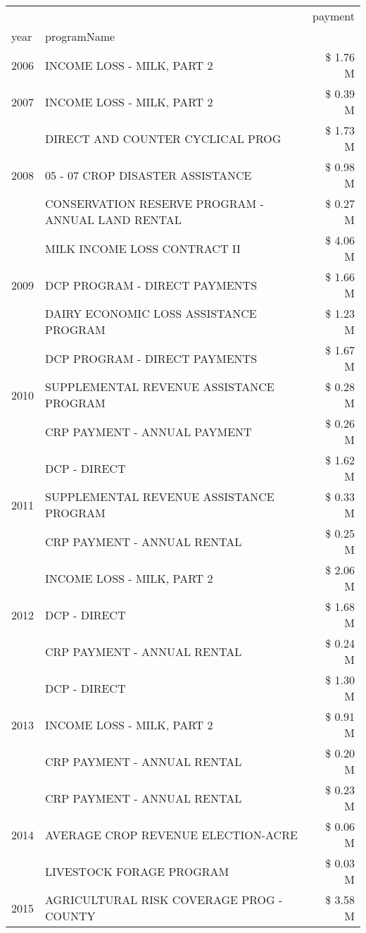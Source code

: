 \begin{tabular}{llr}
\toprule
 &  & payment \\
year & programName &  \\
\midrule
2006 & INCOME LOSS - MILK, PART 2 & \$ 1.76 M \\
\cline{1-3}
2007 & INCOME LOSS - MILK, PART 2 & \$ 0.39 M \\
\cline{1-3}
\multirow[t]{3}{*}{2008} & DIRECT AND COUNTER CYCLICAL PROG & \$ 1.73 M \\
 & 05 - 07 CROP DISASTER ASSISTANCE & \$ 0.98 M \\
 & CONSERVATION RESERVE PROGRAM - ANNUAL LAND RENTAL & \$ 0.27 M \\
\cline{1-3}
\multirow[t]{3}{*}{2009} & MILK INCOME LOSS CONTRACT II & \$ 4.06 M \\
 & DCP PROGRAM - DIRECT PAYMENTS & \$ 1.66 M \\
 & DAIRY ECONOMIC LOSS ASSISTANCE PROGRAM & \$ 1.23 M \\
\cline{1-3}
\multirow[t]{3}{*}{2010} & DCP PROGRAM - DIRECT PAYMENTS & \$ 1.67 M \\
 & SUPPLEMENTAL REVENUE ASSISTANCE PROGRAM & \$ 0.28 M \\
 & CRP PAYMENT - ANNUAL PAYMENT & \$ 0.26 M \\
\cline{1-3}
\multirow[t]{3}{*}{2011} & DCP - DIRECT & \$ 1.62 M \\
 & SUPPLEMENTAL REVENUE ASSISTANCE PROGRAM & \$ 0.33 M \\
 & CRP PAYMENT - ANNUAL RENTAL & \$ 0.25 M \\
\cline{1-3}
\multirow[t]{3}{*}{2012} & INCOME LOSS - MILK, PART 2 & \$ 2.06 M \\
 & DCP - DIRECT & \$ 1.68 M \\
 & CRP PAYMENT - ANNUAL RENTAL & \$ 0.24 M \\
\cline{1-3}
\multirow[t]{3}{*}{2013} & DCP - DIRECT & \$ 1.30 M \\
 & INCOME LOSS - MILK, PART 2 & \$ 0.91 M \\
 & CRP PAYMENT - ANNUAL RENTAL & \$ 0.20 M \\
\cline{1-3}
\multirow[t]{3}{*}{2014} & CRP PAYMENT - ANNUAL RENTAL & \$ 0.23 M \\
 & AVERAGE CROP REVENUE ELECTION-ACRE & \$ 0.06 M \\
 & LIVESTOCK FORAGE PROGRAM & \$ 0.03 M \\
\cline{1-3}
\multirow[t]{3}{*}{2015} & AGRICULTURAL RISK COVERAGE PROG - COUNTY & \$ 3.58 M \\

\end{tabular}
